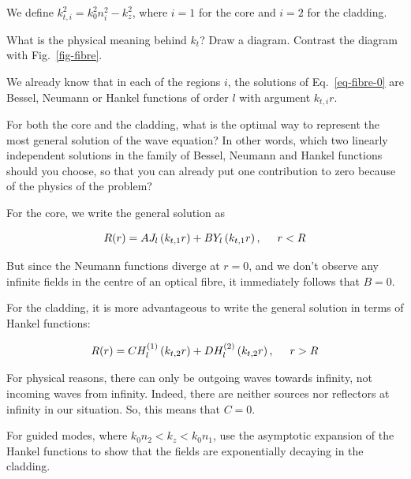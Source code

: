 We define $k_{t,i}^2=k_0^2 n_i^2 - k_z^2$, where $i=1$ for the core and $i=2$ for the cladding.

\begin{exer}
What is the physical meaning behind $k_t$? Draw a diagram. Contrast the diagram with Fig.~\ref{fig-fibre}.
\end{exer}

We already know that in each of the regions $i$, the solutions of Eq.~\ref{eq-fibre-0} are Bessel, Neumann or Hankel functions of order $l$ with argument $k_{t,i} r$.

\begin{cue}
For both the core and the cladding, what is the optimal way to represent the most general solution of the wave equation? In other words, which two linearly independent solutions in the family of Bessel, Neumann and Hankel functions should you choose, so that you can already put one contribution to zero because of the physics of the problem?
\end{cue}

For the core, we write the general solution as

\begin{equation}
R(r) = A J_l\left(k_{t,1}r\right) + B Y_l\left(k_{t,1}r\right), \hspace{0.5 cm} r<R \label{eq-fibre-1}
\end{equation} 

But since the Neumann functions diverge at $r=0$, and we don't observe any infinite fields in the centre of an optical fibre, it immediately follows that $B=0$.

For the cladding, it is more advantageous to write the general solution in terms of Hankel functions:

\begin{equation}
R(r) = C H_l^{(1)}\left(k_{t,2}r\right) + D H_l^{(2)}\left(k_{t,2}r\right), \hspace{0.5 cm} r>R \label{eq-fibre-2}
\end{equation} 

For physical reasons, there can only be outgoing waves towards infinity, not incoming waves from infinity. Indeed, there are neither sources nor reflectors at infinity in our situation. So, this means that $C=0$.

\begin{exer}
For guided modes, where $k_0 n_2 < k_z < k_0 n_1$, use the asymptotic expansion of the Hankel functions to show that the fields are exponentially decaying in the cladding.
\end{exer}

